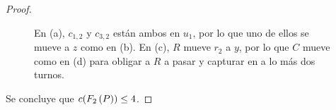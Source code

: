 \begin{proof}
\begin{enumerate}
\begin{figure}[ht!]
\begin{tcbitemize}
{\begin{tikzpicture}
                            \end{tikzpicture}
                        }
                
                \tcbitem
                    \tcblower
            \end{tcbitemize}
            \captionsetup{font=footnotesize}
            \caption{En (a), $c_{1,2}$ y $c_{3,2}$ est\'an ambos en $u_1$, por
            lo que uno de ellos se mueve a $z$ como en (b). En (c), $R$ mueve
            $r_2$ a $y$, por lo que $C$ mueve como en (d) para obligar a $R$ a
            pasar y capturar en a lo m\'as dos turnos.}
            \label{fig:guarding9}
        \end{figure}

    \end{enumerate}
    
    Se concluye que $c(F_{2}\left( P\right))\leq 4$.

\end{proof}